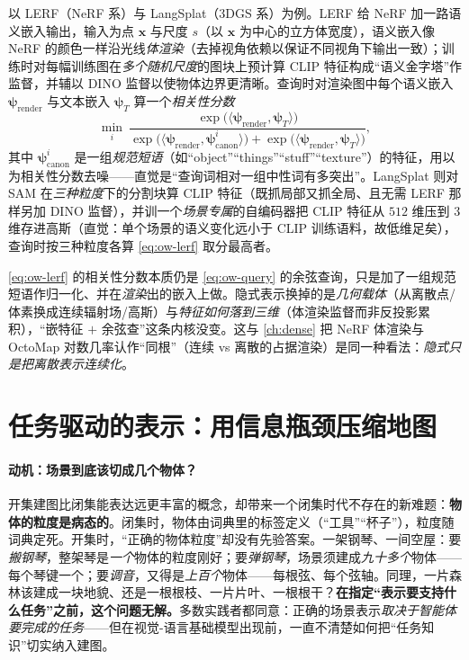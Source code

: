 以 LERF\cite{kerr2023lerf}（NeRF 系）与 LangSplat\cite{qin2024langsplat}（3DGS 系）为例。LERF 给 NeRF 加一路语义嵌入输出，输入为点 $\mathbf{x}$ 与尺度 $s$（以 $\mathbf{x}$ 为中心的立方体宽度），语义嵌入像 NeRF 的颜色一样沿光线\emph{体渲染}（去掉视角依赖以保证不同视角下输出一致）；训练时对每幅训练图在\emph{多个随机尺度}的图块上预计算 CLIP 特征构成“语义金字塔”作监督，并辅以 DINO 监督以使物体边界更清晰。查询时对渲染图中每个语义嵌入 $\boldsymbol\psi_{\mathrm{render}}$ 与文本嵌入 $\boldsymbol\psi_T$ 算一个\emph{相关性分数}
\begin{equation}
  \min_{i}\ \frac{\exp\!\big(\langle\boldsymbol\psi_{\mathrm{render}},\boldsymbol\psi_T\rangle\big)}
  {\exp\!\big(\langle\boldsymbol\psi_{\mathrm{render}},\boldsymbol\psi_{\mathrm{canon}}^{i}\rangle\big)+\exp\!\big(\langle\boldsymbol\psi_{\mathrm{render}},\boldsymbol\psi_T\rangle\big)},
  \label{eq:ow-lerf}
\end{equation}
其中 $\boldsymbol\psi_{\mathrm{canon}}^{i}$ 是一组\emph{规范短语}（如“object”“things”“stuff”“texture”）的特征，用以为相关性分数去噪——直觉是“查询词相对一组中性词有多突出”。LangSplat 则对 SAM 在\emph{三种粒度}下的分割块算 CLIP 特征（既抓局部又抓全局、且无需 LERF 那样另加 DINO 监督），并训一个\emph{场景专属}的自编码器把 CLIP 特征从 $512$ 维压到 $3$ 维存进高斯（直觉：单个场景的语义变化远小于 CLIP 训练语料，故低维足矣），查询时按三种粒度各算 \cref{eq:ow-lerf} 取分最高者。

\begin{insight}[隐式表示仍是同一内核的变体]
\cref{eq:ow-lerf} 的相关性分数本质仍是 \cref{eq:ow-query} 的余弦查询，只是加了一组规范短语作归一化、并在\emph{渲染}出的嵌入上做。隐式表示换掉的是\emph{几何载体}（从离散点/体素换成连续辐射场/高斯）与\emph{特征如何落到三维}（体渲染监督而非反投影累积），“嵌特征 $+$ 余弦查”这条内核没变。这与 \cref{ch:dense} 把 NeRF 体渲染与 OctoMap 对数几率认作“同根”（连续 vs 离散的占据渲染）是同一种看法：\emph{隐式只是把离散表示连续化}。
\end{insight}

\section{任务驱动的表示：用信息瓶颈压缩地图}
\label{sec:openworld-task}

\paragraph{动机：场景到底该切成几个物体？}
开集建图比闭集能表达远更丰富的概念，却带来一个闭集时代不存在的新难题：\textbf{物体的粒度是病态的}\cite{paull2026openworld}。闭集时，物体由词典里的标签定义（“工具”“杯子”），粒度随词典定死。开集时，“正确的物体粒度”却没有先验答案。一架钢琴、一间空屋：要\emph{搬钢琴}，整架琴是\emph{一个}物体的粒度刚好；要\emph{弹钢琴}，场景须建成\emph{九十多个}物体——每个琴键一个；要\emph{调音}，又得是\emph{上百个}物体——每根弦、每个弦轴。同理，一片森林该建成一块地貌、还是一根根枝、一片片叶、一根根干？\textbf{在指定“表示要支持什么任务”之前，这个问题无解。}多数实践者都同意：正确的场景表示\emph{取决于智能体要完成的任务}——但在视觉-语言基础模型出现前，一直不清楚如何把“任务知识”切实纳入建图。

